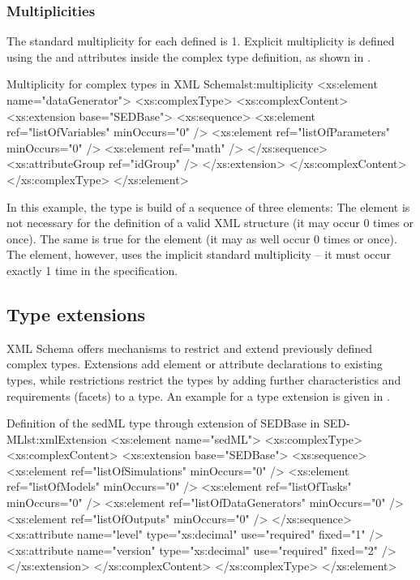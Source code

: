 \subsubsection{Multiplicities}
The standard multiplicity for each defined  is 1. Explicit multiplicity is defined using the  and  attributes inside the complex type definition, as shown in .

\begin{myXmlLst}{Multiplicity for complex types in XML Schema}{lst:multiplicity}
<xs:element name="dataGenerator">
	<xs:complexType>
		<xs:complexContent>
			<xs:extension base="SEDBase">
				<xs:sequence>
					<xs:element ref="listOfVariables" minOccurs="0" />
					<xs:element ref="listOfParameters" minOccurs="0" />
					<xs:element ref="math" />
				</xs:sequence>
				<xs:attributeGroup ref="idGroup" />
			</xs:extension>
		</xs:complexContent>
	</xs:complexType>
</xs:element>
\end{myXmlLst}

In this example, the  type is build of a sequence of three elements: The  element is not necessary for the definition of a valid  XML structure (it may occur 0 times or once). The same is true for the  element (it may as well occur 0 times or once). The  element, however, uses the implicit standard multiplicity -- it must occur exactly 1 time in the  specification.

\subsection{Type extensions}
XML Schema offers mechanisms to restrict and extend previously defined complex types. Extensions add element or attribute declarations to existing types, while restrictions restrict the types by adding further characteristics and requirements (facets) to a type. An example for a type extension is given in .

\begin{myXmlLst}{Definition of the sedML type through extension of SEDBase in SED-ML}{lst:xmlExtension}
	<xs:element name="sedML">
		<xs:complexType>
			<xs:complexContent>
				<xs:extension base="SEDBase">
					<xs:sequence>
						<xs:element ref="listOfSimulations" minOccurs="0" />
						<xs:element ref="listOfModels" minOccurs="0" />
						<xs:element ref="listOfTasks" minOccurs="0" />
						<xs:element ref="listOfDataGenerators" minOccurs="0" />
						<xs:element ref="listOfOutputs" minOccurs="0" />
					</xs:sequence>
					<xs:attribute name="level" type="xs:decimal" use="required"
						fixed="1" />
					<xs:attribute name="version" type="xs:decimal" use="required"
						fixed="2" />
				</xs:extension>
			</xs:complexContent>
		</xs:complexType>
	</xs:element>
\end{myXmlLst}


